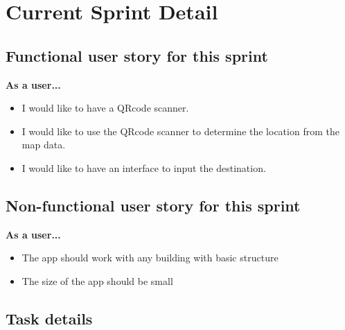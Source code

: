 \documentclass[12pt]{article}
\begin{document}
\section{Current Sprint Detail}

\subsection{Functional user story for this sprint}

\textbf{As a user...}
\begin{itemize}
\item I would like to have a QR­code scanner.
\item I would like to use the QR­code scanner to determine the location from the map data.
\item I would like to have an interface to input the destination.
\end{itemize}

\subsection{Non-functional user story for this sprint}

\textbf{As a user...}
\begin{itemize}

\item The app should work with any building with basic structure 
\item The size of the app should be small
\end{itemize}


\subsection{Task details}


%
\end{document}
